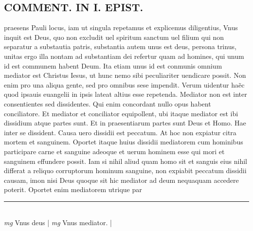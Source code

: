 \documentclass{article}
\begin{document}
\begin{pages}
\section*{COMMENT. IN I. EPIST. }\pstart praesens Pauli locus, iam ut singula repetamus et explicemus diligentius, Vnus inquit est Deus, quo non excludit uel spiritum sanctum uel filium qui non separatur a substautia patris, substantia autem unus est deus, persona trinus, unitas ergo illa nontam ad substantiam dei refertur quam ad homines, qui unum id est communem habent Deum. Ita etiam unus id est conmunis omnium mediator est Christus Iesus, ut hunc nemo sibi peculiariter uendicare possit. Non enim pro una aliqua gente, sed pro omnibus sese impendit. Verum uidentur haẽc quod ipsauis euangelii in ipsis lateat altius esse repetenda. Mediator non est inter consentientes sed dissidentes. Qui enim concordant nullo opus habent conciliatore. Et mediator et conciliator equipollent, ubi itaque mediator est ibi dissidium atque  partes sunt. Et in praesentiarum partes sunt Deus et Homo. Hae inter se dissident. Causa uero dissidii est peccatum. At hoc non expiatur citra mortem et sanguinem. Oportet itaque huius dissidii mediatorem cum hominibus participare carne et sanguine adeoque et uerum hominem esse qui mori et sanguinem effundere possit. Iam si nihil aliud quam homo sit et sanguis eius nihil differat a reliquo corruptorum hominum sanguine, non expiabit peccatum dissidii causam, imon nisi Deus quoque sit hic mediator ad deum nequaquam accedere poterit. Oportet enim mediatorem utrique par\pend
\vspace{0.5cm}\noindent
\vspace{0.2cm}\rule{1cm}{0.2pt}\\ 
\hspace{0.2cm}\textit{mg}
\footnotesize Vnus deus 
\normalsize| 
\hspace{0.2cm}\textit{mg}
\footnotesize Vnus mediator. 
\normalsize| 

\end{pages}
\end{document}
